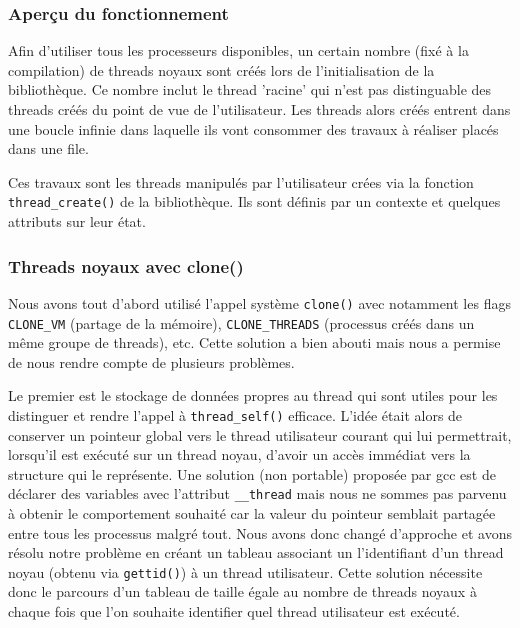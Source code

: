 \subsubsection{Aperçu du fonctionnement}

Afin d'utiliser tous les processeurs disponibles, un certain nombre (fixé à la compilation) de threads noyaux sont créés lors de l'initialisation de la bibliothèque. Ce nombre inclut le thread 'racine' qui n'est pas distinguable des threads créés du point de vue de l'utilisateur. Les threads alors créés entrent dans une boucle infinie dans laquelle ils vont consommer des travaux à réaliser placés dans une file.

Ces travaux sont les threads manipulés par l'utilisateur crées via la fonction \verb!thread_create()! de la bibliothèque. Ils sont définis par un contexte et quelques attributs sur leur état.


\subsubsection{Threads noyaux avec clone()}

Nous avons tout d'abord utilisé l'appel système \verb!clone()! avec notamment les flags \verb!CLONE_VM! (partage de la mémoire), \verb!CLONE_THREADS! (processus créés dans un même groupe de threads), etc. Cette solution a bien abouti mais nous a permise de nous rendre compte de plusieurs problèmes.

Le premier est le stockage de données propres au thread qui sont utiles pour les distinguer et rendre l'appel à \verb!thread_self()! efficace. L'idée était alors de conserver un pointeur global vers le thread utilisateur courant qui lui permettrait, lorsqu'il est exécuté sur un thread noyau, d'avoir un accès immédiat vers la structure qui le représente. Une solution (non portable) proposée par gcc est de déclarer des variables avec l'attribut \verb!__thread! mais nous ne sommes pas parvenu à obtenir le comportement souhaité car la valeur du pointeur semblait partagée entre tous les processus malgré tout. Nous avons donc changé d'approche et avons résolu notre problème en créant un tableau associant un l'identifiant d'un thread noyau (obtenu via \verb!gettid()!) à un thread utilisateur. Cette solution nécessite donc le parcours d'un tableau de taille égale au nombre de threads noyaux à chaque fois que l'on souhaite identifier quel thread utilisateur est exécuté.

